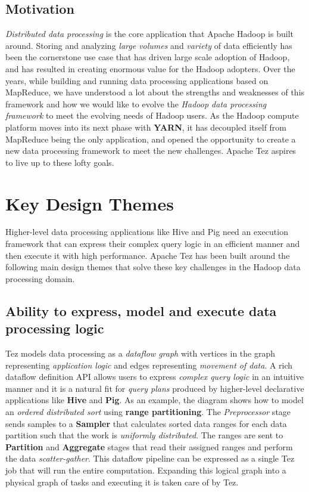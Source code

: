 \documentclass[twocolumn]{article}
\begin{document}
\subsection{Motivation}

\emph{Distributed data processing} is the core application that Apache
Hadoop is built around. Storing and analyzing \emph{large volumes} and
\emph{variety} of data efficiently has been the cornerstone use case
that has driven large scale adoption of Hadoop, and has resulted in
creating enormous value for the Hadoop adopters. Over the years, while
building and running data processing applications based on MapReduce, we
have understood a lot about the strengths and weaknesses of this
framework and how we would like to evolve the \emph{Hadoop data
processing framework} to meet the evolving needs of Hadoop users. As the
Hadoop compute platform moves into its next phase with \textbf{YARN}, it
has decoupled itself from MapReduce being the only application, and
opened the opportunity to create a new data processing framework to meet
the new challenges. Apache Tez aspires to live up to these lofty goals.

\section{Key Design Themes}

Higher-level data processing applications like Hive and Pig need an
execution framework that can express their complex query logic in an
efficient manner and then execute it with high performance. Apache Tez
has been built around the following main design themes that solve these
key challenges in the Hadoop data processing domain.

\subsection{Ability to express, model and execute data processing logic}

Tez models data processing as a \emph{dataflow graph} with vertices in
the graph representing \emph{application logic} and edges representing
\emph{movement of data}. A rich dataflow definition API allows users to
express \emph{complex query logic} in an intuitive manner and it is a
natural fit for \emph{query plans} produced by higher-level declarative
applications like \textbf{Hive} and \textbf{Pig}. As an example, the
diagram shows how to model an \emph{ordered distributed sort} using
\textbf{range partitioning}. The \emph{Preprocessor} stage sends samples
to a \textbf{Sampler} that calculates sorted data ranges for each data
partition such that the work is \emph{uniformly distributed}. The ranges
are sent to \textbf{Partition} and \textbf{Aggregate} stages that read
their assigned ranges and perform the data \emph{scatter-gather}. This
dataflow pipeline can be expressed as a single Tez job that will run the
entire computation. Expanding this logical graph into a physical graph
of tasks and executing it is taken care of by Tez.
\end{document}
